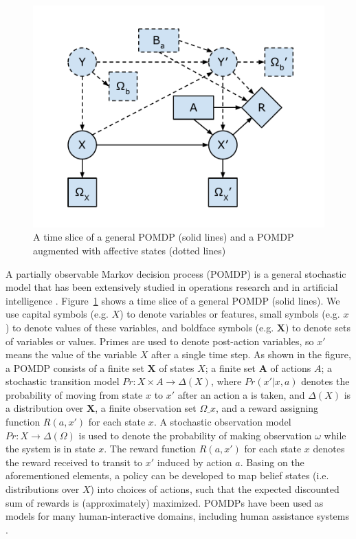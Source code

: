 \begin{figure}[p]
\centering
\includegraphics{fig-pomdp.pdf}
\caption{A time slice of a general POMDP (solid lines) and a POMDP augmented with affective states (dotted lines)}
\label{fig:pomdp}
\end{figure}

A partially observable Markov decision process (POMDP) is a general stochastic model that has been extensively studied in operations research and in artificial intelligence \cite{monahan1982state, poupart2011introduction}. Figure~\ref{fig:pomdp} shows a time slice of a general POMDP (solid lines). We use capital symbols (e.g. $X$) to denote variables or features, small symbols (e.g. $x$) to denote values of these variables, and boldface symbols (e.g. $\mathbf{X}$) to denote sets of variables or values. Primes are used to denote post-action variables, so $x'$ means the value of the variable $X$ after a single time step. As shown in the figure, a POMDP consists of a finite set $\mathbf{X}$ of states $X$; a finite set $\mathbf{A}$ of actions $A$; a stochastic transition model $Pr : X \times A \to \Delta(X)$, where $Pr(x'|x, a)$ denotes the probability of moving from state $x$ to $x'$ after an action a is taken, and $\Delta(X)$ is a distribution over $\mathbf{X}$, a finite observation set $\Omega\_{x}$, and a reward assigning function $R(a, x')$ for each state $x$. A stochastic observation model $Pr : X \to \Delta(\Omega)$ is used to denote the probability of making observation $\omega$ while the system is in state $x$. The reward function $R(a, x')$ for each state $x$ denotes the reward received to transit to $x'$ induced by action $a$. Basing on the aforementioned elements, a policy can be developed to map belief states (i.e. distributions over $X$) into choices of actions, such that the expected discounted sum of rewards is (approximately) maximized. POMDPs have been used as models for many human-interactive domains, including human assistance systems \cite{hoey2010automated}.

